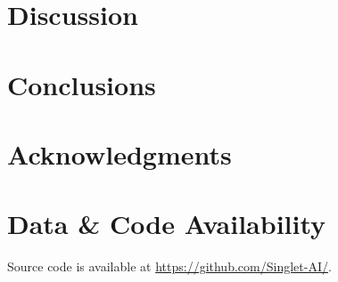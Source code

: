 \documentclass[10pt,twocolumn,letterpaper]{article}
\begin{document}
\section{Discussion}

\section{Conclusions}

\section*{Acknowledgments}

\section*{Data \& Code Availability}
Source code is available at \url{https://github.com/Singlet-AI/}.


\end{document}
